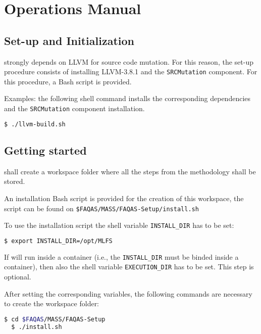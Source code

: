 
\chapter{Operations Manual}

\section{Set-up and Initialization}

\MASS strongly depends on LLVM for source code mutation. For this reason, the set-up procedure consists of installing LLVM-3.8.1 and the \texttt{SRCMutation} component. For this procedure, a Bash script is provided.

Examples: the following shell command installs the corresponding dependencies and the \texttt{SRCMutation} component installation.

\begin{lstlisting}[language=bash]
  $ ./llvm-build.sh
\end{lstlisting}


\section{Getting started}

\MASS shall create a workspace folder where all the steps from the methodology shall be stored. 

An installation Bash script is provided for the creation of this workspace, the script can be found on \texttt{\$FAQAS/MASS/FAQAS-Setup/install.sh}

To use the installation script the shell variable \texttt{INSTALL\_DIR} has to be set:

\begin{lstlisting}[language=bash]
  $ export INSTALL_DIR=/opt/MLFS
\end{lstlisting}

If \MASS will run inside a container (i.e., the \texttt{INSTALL\_DIR} must be binded inside a container), then also the shell variable \texttt{EXECUTION\_DIR} has to be set. This step is optional.

After setting the corresponding variables, the following commands are necessary to create the \MASS workspace folder:

\begin{lstlisting}[language=bash]
  $ cd $FAQAS/MASS/FAQAS-Setup
  $ ./install.sh
\end{lstlisting}


